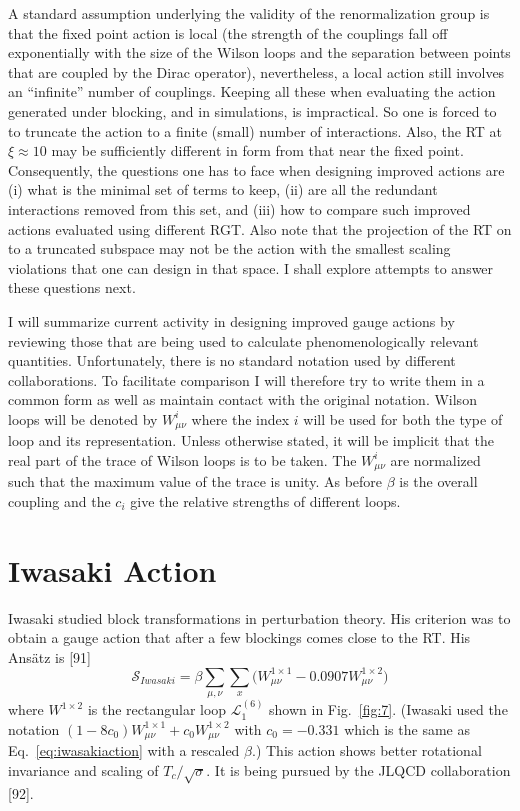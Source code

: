 A standard assumption underlying the validity of the renormalization
group is that the fixed point action is local (the strength of the
couplings fall off exponentially with the size of the Wilson loops and
the separation between points that are coupled by the Dirac operator),
nevertheless, a local action still involves an ``infinite'' number of
couplings.  Keeping all these when evaluating the action generated
under blocking, and in simulations, is impractical.  So one is forced to
to truncate the action to a finite (small) number of interactions.
Also, the RT at $\xi \approx 10$ may be sufficiently different in form
from that near the fixed point.  Consequently, the questions one has to
face when designing improved actions are (i) what is the minimal set of
terms to keep, (ii) are all the redundant interactions removed from this
set, and (iii) how to compare such improved actions evaluated using
different RGT.  Also note that the projection of the RT on to a truncated
subspace may not be the action with the smallest scaling violations that
one can design in that space.  I shall explore attempts to answer these
questions next.

I will summarize current activity in designing improved gauge actions
by reviewing those that are being used to calculate phenomenologically
relevant quantities.  Unfortunately, there is no standard notation used
by different collaborations.  To facilitate comparison I will therefore
try to write them in a common form as well as maintain contact with the
original notation.  Wilson loops will be denoted by $W^i_{\mu\nu}$
where the index $i$ will be used for both the type of loop and its
representation.  Unless otherwise stated, it will be implicit that the
real part of the trace of Wilson loops is to be taken.  The
$W^i_{\mu\nu}$ are normalized such that the maximum value of the trace
is unity.  As before $\beta$ is the overall coupling and the $c_i$ give
the relative strengths of different loops.

\section{Iwasaki Action}

Iwasaki studied block transformations in perturbation theory.  His
criterion was to obtain a gauge action that after a few blockings comes
close to the RT.  His Ans\"atz is [91]
\begin{equation}
\mathcal{S}_{Iwasaki} = \beta\sum_{\mu,\nu}\sum_x
    \bigg(W^{1\times1}_{\mu\nu} - 0.0907W^{1\times2}_{\mu\nu}\bigg)
\label{eq:iwasakiaction}
\end{equation}
where $W^{1\times2}$ is the rectangular loop $\mathcal{L}_1^{(6)}$
shown in Fig.~\ref{fig:7}.  (Iwasaki used the notation
$(1-8c_0)W^{1\times1}_{\mu\nu} + c_0W^{1\times2}_{\mu\nu}$ with
$c_0 = -0.331$ which is the same as Eq.~\ref{eq:iwasakiaction} with a
rescaled $\beta$.)  This action shows better rotational invariance and
scaling of $T_c/\sqrt{\sigma}$.  It is being pursued by the JLQCD
collaboration [92].

